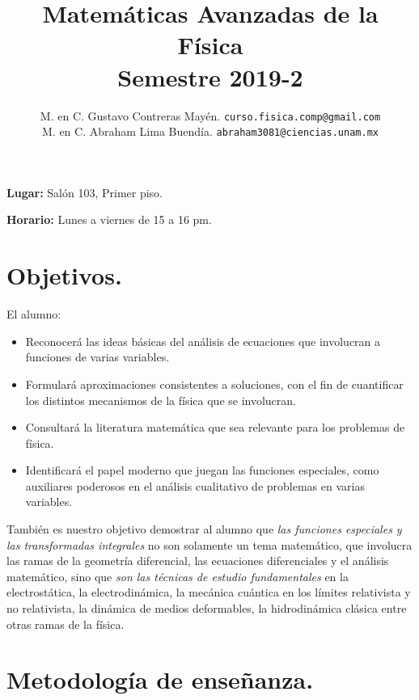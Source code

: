 \documentclass[12pt]{article}
\author{M. en C. Gustavo Contreras Mayén. \texttt{curso.fisica.comp@gmail.com}\\
M. en C. Abraham Lima Buendía. \texttt{abraham3081@ciencias.unam.mx}}
\title{Matemáticas Avanzadas de la Física \\ {\large Semestre 2019-2}}
\date{ }
\begin{document}
\vspace{-4cm}
\renewcommand\labelenumii{\theenumi.{\arabic{enumii}}}
\maketitle
\fontsize{14}{14}\selectfont
\textbf{Lugar: } Salón 103, Primer piso.
\par
\textbf{Horario: } Lunes a viernes de 15 a 16 pm.
\section{Objetivos.}
El alumno:
\begin{itemize}
\setlength{\itemsep}{0mm}
\item Reconocerá las ideas básicas del análisis de ecuaciones que involucran a funciones de varias variables.
\item Formulará aproximaciones consistentes a soluciones, con el fin de cuantificar los distintos mecanismos de la física que se involucran.
\item Consultará la literatura matemática que sea relevante para los problemas de física.
\item Identificará el papel moderno que juegan las funciones especiales, como auxiliares poderosos en el análisis cualitativo de problemas en varias variables.
\end{itemize}
También es nuestro objetivo demostrar al alumno que \emph{las funciones especiales y las transformadas integrales} no son solamente un tema matemático, que involucra las ramas de la geometría diferencial, las ecuaciones diferenciales y el análisis matemático, sino que \emph{son las técnicas de estudio fundamentales} en la electrostática, la electrodinámica, la mecánica cuántica en los límites relativista y no relativista, la dinámica de medios deformables, la hidrodinámica clásica entre otras ramas de la física.
\section{Metodología de enseñanza.}
\end{document}
